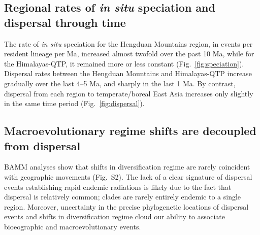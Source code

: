 \subsection{Regional rates of \textit{in situ} speciation and dispersal through time}

The rate of \textit{in situ} speciation for the Hengduan Mountains region, in events per resident lineage per Ma, increased almost twofold over the past 10 Ma, while for the Himalayas-QTP, it remained more or less constant (Fig.~\ref{fig:speciation}). Dispersal rates between the Hengduan Mountains and Himalayas-QTP increase gradually over the last 4--5 Ma, and sharply in the last 1 Ma. By contrast, dispersal from each region to temperate/boreal East Asia increases only slightly in the same time period (Fig.~\ref{fig:dispersal}).

\subsection{Macroevolutionary regime shifts are decoupled from dispersal}

BAMM analyses show that shifts in diversification regime are rarely coincident with geographic movements (Fig.~S2). The lack of a clear signature of dispersal events establishing rapid endemic radiations is likely due to the fact that dispersal is relatively common; clades are rarely entirely endemic to a single region. Moreover, uncertainty in the precise phylogenetic locations of dispersal events and shifts in diversification regime cloud our ability to associate bioeographic and macroevolutionary events.